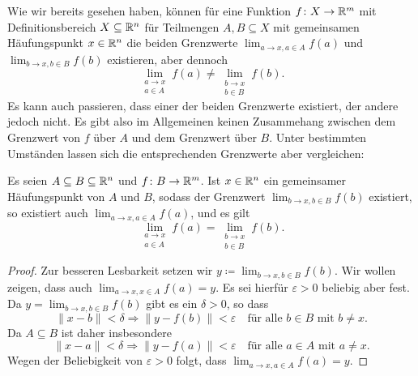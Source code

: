 \documentclass[a4paper,10pt]{article}
\begin{document}
Wie wir bereits gesehen haben, können für eine Funktion $f \colon X \to \mathbb{R}^m$ mit Definitionsbereich $X \subseteq \mathbb{R}^n$ für Teilmengen $A, B \subseteq X$ mit gemeinsamen Häufungspunkt $x \in \mathbb{R}^n$ die beiden Grenzwerte $\lim_{a \to x, a \in A} f(a)$ und $\lim_{b \to x, b \in B} f(b)$ existieren, aber dennoch
\[
 \lim_{\substack{a \to x \\ a \in A}} f(a)
 \neq
 \lim_{\substack{b \to x \\ b \in B}} f(b).
\]
Es kann auch passieren, dass einer der beiden Grenzwerte existiert, der andere jedoch nicht. Es gibt also im Allgemeinen keinen Zusammehang zwischen dem Grenzwert von $f$ über $A$ und dem Grenzwert über $B$. Unter bestimmten Umständen lassen sich die entsprechenden Grenzwerte aber vergleichen:


\begin{lem}\label{lem: Grenzwerte auf Teilmengen}
 Es seien $A \subseteq B \subseteq \mathbb{R}^n$ und $f \colon B \to \mathbb{R}^m$. Ist $x \in \mathbb{R}^n$ ein gemeinsamer Häufungspunkt von $A$ und $B$, sodass der Grenzwert $\lim_{b \to x, b \in B} f(b)$ existiert, so existiert auch $\lim_{a \to x, a \in A} f(a)$, und es gilt
 \[
  \lim_{\substack{a \to x \\ a \in A}} f(a)
  = \lim_{\substack{b \to x \\ b \in B}} f(b).
 \]
\end{lem}
\begin{proof}
 Zur besseren Lesbarkeit setzen wir $y \coloneqq \lim_{b \to x, b \in B} f(b)$. Wir wollen zeigen, dass auch $\lim_{a \to x, x \in A} f(a) = y$. Es sei hierfür $\varepsilon > 0$ beliebig aber fest. Da \mbox{$y = \lim_{b \to x, b \in B} f(b)$} gibt es ein $\delta > 0$, so dass
 \[
  \|x-b\| < \delta \Rightarrow \|y-f(b)\| < \varepsilon \quad \text{für alle $b \in B$ mit $b \neq x$}.
 \]
 Da $A \subseteq B$ ist daher insbesondere
 \[
  \|x-a\| < \delta \Rightarrow \|y-f(a)\| < \varepsilon \quad \text{für alle $a \in A$ mit $a \neq x$}.
 \]
 Wegen der Beliebigkeit von $\varepsilon > 0$ folgt, dass $\lim_{a \to x, a \in A} f(a) = y$.
\end{proof}
\end{document}

